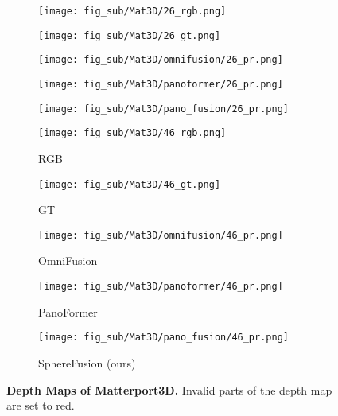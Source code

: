 \begin{figure*}[t]
	\begin{subfigure}{0.18\linewidth}
		\texttt{[image: fig\_sub/Mat3D/26\_rgb.png]}
	\end{subfigure}
	\begin{subfigure}{0.18\linewidth}
		\texttt{[image: fig\_sub/Mat3D/26\_gt.png]}
	\end{subfigure}
	\begin{subfigure}{0.18\linewidth}
		\texttt{[image: fig\_sub/Mat3D/omnifusion/26\_pr.png]}
	\end{subfigure}
	\begin{subfigure}{0.18\linewidth}
		\texttt{[image: fig\_sub/Mat3D/panoformer/26\_pr.png]}
	\end{subfigure}
	\begin{subfigure}{0.18\linewidth}
		\texttt{[image: fig\_sub/Mat3D/pano\_fusion/26\_pr.png]}
	\end{subfigure}
	
	\vspace{1pt}
	
	\begin{subfigure}{0.18\linewidth}
		\texttt{[image: fig\_sub/Mat3D/46\_rgb.png]}
		\caption{RGB}
	\end{subfigure}
	\begin{subfigure}{0.18\linewidth}
		\texttt{[image: fig\_sub/Mat3D/46\_gt.png]}
		\caption{GT}
	\end{subfigure}
	\begin{subfigure}{0.18\linewidth}
		\texttt{[image: fig\_sub/Mat3D/omnifusion/46\_pr.png]}
		\caption{OmniFusion \cite{li2022omnifusion}}
	\end{subfigure}
	\begin{subfigure}{0.18\linewidth}
		\texttt{[image: fig\_sub/Mat3D/panoformer/46\_pr.png]}
		\caption{PanoFormer \cite{shen2022panoformer}}
	\end{subfigure}
	\begin{subfigure}{0.18\linewidth}
		\texttt{[image: fig\_sub/Mat3D/pano\_fusion/46\_pr.png]}
		\caption{SphereFusion (ours)}
	\end{subfigure}
	
	
	\caption{
		\textbf{Depth Maps of Matterport3D.} Invalid parts of the depth map are set to red. 
	}
	\label{fig:mat3d_depth}
    \vspace{-1.0em}
\end{figure*}


